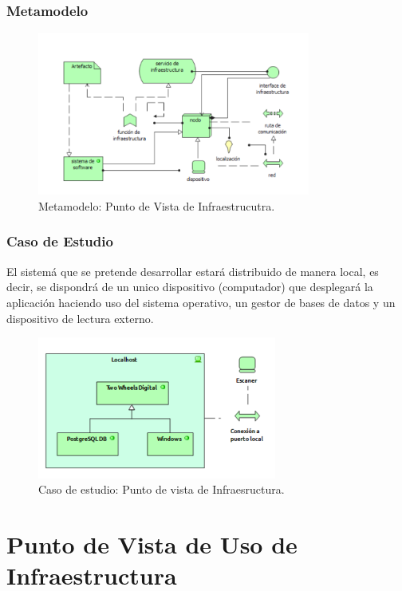 \subsubsection{Metamodelo}
\begin{figure}[h]
	\centering
	\includegraphics[width=0.8\textwidth]{imagenes/Metamodelos/Tecnologia/meta_infraestructura.PDF}
	\caption{Metamodelo: Punto de Vista de Infraestrucutra.}
	\label{fig:gap_analysis}
\end{figure}

\subsubsection{Caso de Estudio}
El sistemá que se pretende desarrollar estará distribuido de manera local, es decir, se dispondrá de un unico dispositivo (computador) que desplegará la aplicación haciendo uso del sistema operativo, un gestor de bases de datos y un dispositivo de lectura externo.


\begin{figure}[h]
	\centering
	\includegraphics[width=0.7\textwidth]{imagenes/Caso_Estudio/Tecnologia/infraestructura.PDF}
	\caption{Caso de estudio: Punto de vista de Infraesructura.}
	\label{fig:gap_analysis}
\end{figure}

\section{Punto de Vista de Uso de Infraestructura}
